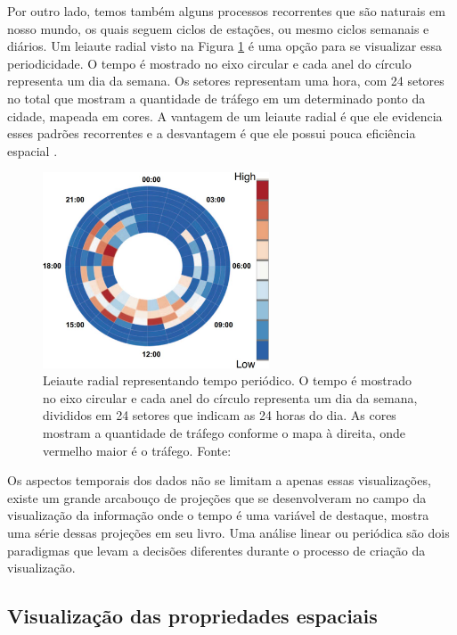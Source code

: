   Por outro lado, temos também alguns processos recorrentes que são naturais em
nosso mundo, os quais seguem ciclos de estações, ou mesmo ciclos semanais e
diários. Um leiaute radial visto na Figura \ref{fig:periodic-time} é uma opção
para se visualizar essa periodicidade. O tempo é mostrado no eixo circular e
cada anel do círculo representa um dia da semana.  Os setores representam uma
hora, com 24 setores no total que mostram a quantidade de tráfego em um
determinado ponto da cidade, mapeada em cores. A vantagem de um leiaute radial
é que ele evidencia esses padrões recorrentes e a desvantagem é que ele possui
pouca eficiência espacial \citep{Chen2015}.

\begin{figure}[!htb]
  \centering
  \includegraphics[width=0.6\textwidth]{../figuras/periodic-time.png}
  \caption[Leiaute radial representando tempo periódico]{Leiaute radial
representando tempo periódico. O tempo é mostrado no eixo circular e cada anel
do círculo representa um dia da semana, divididos em 24 setores que indicam as
24 horas do dia. As cores mostram a quantidade de tráfego conforme o mapa à
direita, onde vermelho maior é o tráfego. Fonte:
\citet{Pu2013} \label{fig:periodic-time}}
\end{figure}

  Os aspectos temporais dos dados não se limitam a apenas essas visualizações,
existe um grande arcabouço de projeções que se desenvolveram no campo da
visualização da informação onde o tempo é uma variável de destaque,
\citet{Cairo2016} mostra uma série dessas projeções em seu livro. Uma análise
linear ou periódica são dois paradigmas que levam a decisões diferentes durante
o processo de criação da visualização.

\subsection{Visualização das propriedades espaciais}
\label{sec:prop-espaciais}

